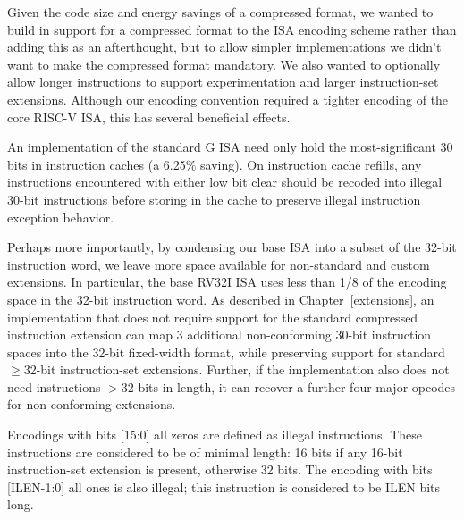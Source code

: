 \begin{samepage-commentary}
Given the code size and energy savings of a compressed format, we
wanted to build in support for a compressed format to the ISA encoding
scheme rather than adding this as an afterthought, but to allow
simpler implementations we didn't want to make the compressed format
mandatory. We also wanted to optionally allow longer instructions to
support experimentation and larger instruction-set extensions.
Although our encoding convention required a tighter encoding of the
core RISC-V ISA, this has several beneficial effects.

An implementation of the standard G ISA need only hold the
most-significant 30 bits in instruction caches (a 6.25\% saving).  On
instruction cache refills, any instructions encountered with either
low bit clear should be recoded into illegal 30-bit instructions
before storing in the cache to preserve illegal instruction exception
behavior.

Perhaps more importantly, by condensing our base ISA into a subset of
the 32-bit instruction word, we leave more space available for
non-standard and custom extensions.  In particular, the base RV32I ISA
uses less than 1/8 of the encoding space in the 32-bit instruction
word.  As described in Chapter~\ref{extensions}, an implementation
that does not require support for the standard compressed instruction
extension can map 3 additional non-conforming 30-bit instruction
spaces into the 32-bit fixed-width format, while preserving support
for standard $\geq$32-bit instruction-set extensions.  Further, if the
implementation also does not need instructions $>$32-bits in length,
it can recover a further four major opcodes for non-conforming extensions.
\end{samepage-commentary}

Encodings with bits [15:0] all zeros are defined as illegal
instructions.  These instructions are considered to be of minimal
length: 16 bits if any 16-bit instruction-set extension is present,
otherwise 32 bits.  The encoding with bits [ILEN-1:0] all ones is also
illegal; this instruction is considered to be ILEN bits long.

